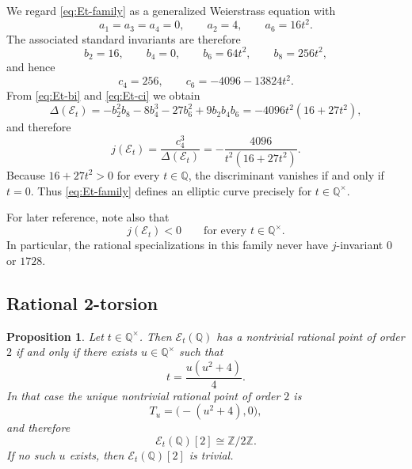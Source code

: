 \documentclass[11pt,a4paper]{amsart}
\newtheorem{proposition}[theorem]{Proposition}
\theoremstyle{definition}
\theoremstyle{remark}
\numberwithin{equation}{section}
\newcommand{\Q}{\mathbb{Q}}
\newcommand{\Z}{\mathbb{Z}}
\newcommand{\mathcalE}{\mathcal{E}}
\begin{document}
We regard \eqref{eq:Et-family} as a generalized Weierstrass equation with
\[
a_1=a_3=a_4=0,\qquad a_2=4,\qquad a_6=16t^2.
\]
The associated standard invariants are therefore
\begin{equation}\label{eq:Et-bi}
b_2=16,\qquad b_4=0,\qquad b_6=64t^2,\qquad b_8=256t^2,
\end{equation}
and hence
\begin{equation}\label{eq:Et-ci}
c_4=256,\qquad c_6=-4096-13824t^2.
\end{equation}
From \eqref{eq:Et-bi} and \eqref{eq:Et-ci} we obtain
\begin{equation}\label{eq:Et-discriminant}
\Delta(\mathcalE_t)
=-b_2^2b_8-8b_4^3-27b_6^2+9b_2b_4b_6
=-4096t^2(16+27t^2),
\end{equation}
and therefore
\begin{equation}\label{eq:Et-j}
j(\mathcalE_t)=\frac{c_4^3}{\Delta(\mathcalE_t)}
=-\frac{4096}{t^2(16+27t^2)}.
\end{equation}
Because $16+27t^2>0$ for every $t\in\Q$, the discriminant vanishes if and only if $t=0$. Thus \eqref{eq:Et-family} defines an elliptic curve precisely for $t\in\Q^\times$.

For later reference, note also that
\[
j(\mathcalE_t)<0\qquad\text{for every }t\in\Q^\times.
\]
In particular, the rational specializations in this family never have $j$-invariant $0$ or $1728$.

\subsection{Rational 2-torsion}\label{subsec:family-2torsion}

\begin{proposition}\label{prop:Et-2torsion}
Let $t\in\Q^\times$. Then $\mathcalE_t(\Q)$ has a nontrivial rational point of order $2$ if and only if there exists $u\in\Q^\times$ such that
\begin{equation}\label{eq:Et-2torsion-param}
t=\frac{u(u^2+4)}{4}.
\end{equation}
In that case the unique nontrivial rational point of order $2$ is
\begin{equation}\label{eq:Et-2torsion-point}
T_u=\bigl(-(u^2+4),0\bigr),
\end{equation}
and therefore
\[
\mathcalE_t(\Q)[2]\cong \Z/2\Z.
\]
If no such $u$ exists, then $\mathcalE_t(\Q)[2]$ is trivial.
\end{proposition}
\end{document}
